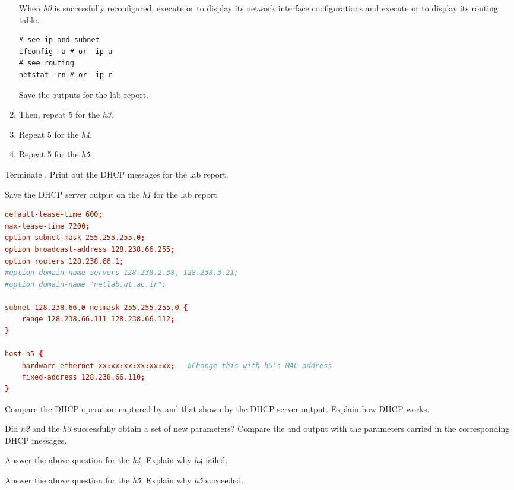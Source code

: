 \documentclass{../UTNetLab}
\begin{document}
\begin{enumerate}
          When \textit{h0} is successfully reconfigured, execute  or  to display its
          network interface configurations and execute  or  to display its routing table.

          \begin{lstlisting}
# see ip and subnet
ifconfig -a # or  ip a
# see routing
netstat -rn # or  ip r
          \end{lstlisting}

          Save the outputs for the lab report.

    \item Then, repeat 5 for the \textit{h3}.

    \item Repeat 5 for the \textit{h4}.

    \item Repeat 5 for the \textit{h5}.
\end{enumerate}

Terminate .
Print out the DHCP messages for the lab report.

Save the DHCP server output on the \textit{h1} for the lab report.

\begin{lstlisting}[language={conf}, caption={A DHCP server configuration file (Table~8.3)\label{tab:8.3}},emph={xx}]
default-lease-time 600;
max-lease-time 7200;
option subnet-mask 255.255.255.0;
option broadcast-address 128.238.66.255;
option routers 128.238.66.1;
#option domain-name-servers 128.238.2.38, 128.238.3.21;
#option domain-name "netlab.ut.ac.ir";

subnet 128.238.66.0 netmask 255.255.255.0 {
    range 128.238.66.111 128.238.66.112;
}

host h5 {
    hardware ethernet xx:xx:xx:xx:xx:xx;   #Change this with h5's MAC address
    fixed-address 128.238.66.110;
}
\end{lstlisting}

\begin{report}
    \item Compare the DHCP operation captured by  and that shown by the DHCP server output.
    Explain how DHCP works.

    \item Did \textit{h2} and the \textit{h3} successfully obtain a set of new parameters?
    Compare the  and  output with the parameters carried in the corresponding DHCP messages.

    \item Answer the above question for the \textit{h4}.
    Explain why \textit{h4} failed.

    \item Answer the above question for the \textit{h5}.
    Explain why \textit{h5} succeeded.
\end{report}
\end{document}
